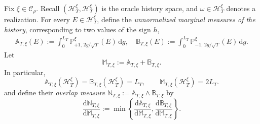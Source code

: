 \documentclass[10pt]{article}
\newcommand{\dd}{\mathrm{d}}
\theoremstyle{plain}
\begin{document}
Fix $\xi\in\mathcal C_\rho$. Recall $(\mathcal H_T^\xi,\mathscr H_T^\xi)$ is the oracle history space, and 
$\omega\in\mathcal H_T^\xi$ denotes a realization. For every
$E\in\mathscr H_T^\xi$, define the \emph{unnormalized marginal measures of the history}, corresponding to two values of the sign $h$,
\begin{equation}
\label{eq:sign-mixture-measures-transfer-lower}
\begin{aligned}
    \mathbb A_{T,\xi}(E)
    :=
    \int_0^{L_T}
        \mathbb P_{+1,\,2g/\sqrt T}^{\xi}(E)
    \,\dd g,\quad
    \mathbb B_{T,\xi}(E)
    :=
    \int_0^{L_T}
        \mathbb P_{-1,\,2g/\sqrt T}^{\xi}(E)
    \,\dd g.
\end{aligned}
\end{equation}
Let
\[
    \mathbb M_{T,\xi}
    :=
    \mathbb A_{T,\xi}
    +
    \mathbb B_{T,\xi}.
\]
In particular,
\[
    \mathbb A_{T,\xi}(\mathcal H_T^\xi)
    =
    \mathbb B_{T,\xi}(\mathcal H_T^\xi)
    =
    L_T,
    \qquad
    \mathbb M_{T,\xi}(\mathcal H_T^\xi)
    =
    2L_T.
\]
and define their \emph{overlap measure}
    $\mathbb N_{T,\xi}
    :=
    \mathbb A_{T,\xi}\wedge\mathbb B_{T,\xi}$
by
\[
    \frac{\dd\mathbb N_{T,\xi}}
         {\dd\mathbb M_{T,\xi}}
    :=
    \min\left\{
        \frac{\dd\mathbb A_{T,\xi}}
             {\dd\mathbb M_{T,\xi}},
        \frac{\dd\mathbb B_{T,\xi}}
             {\dd\mathbb M_{T,\xi}}
    \right\}.
\]
\end{document}

